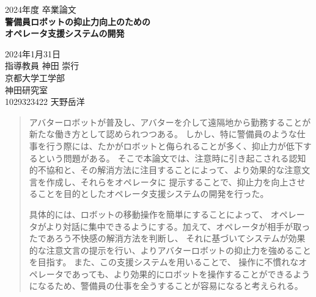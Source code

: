 \documentclass[11pt,a4j]{jreport}
\begin{document}
\thispagestyle{empty}
\begin{center}

\vspace{20mm}
{\Large\noindent 2024年度 卒業論文}\\
\vspace{40mm}
{\huge\noindent\textbf{警備員ロボットの抑止力向上のための}}\\
\medskip
{\huge\noindent\textbf{オペレータ支援システムの開発}}\\
\vspace{\baselineskip}
\vspace{40mm}

{\Large\noindent
2024年1月31日\\
\vspace{\baselineskip}
指導教員 神田  崇行\\
\vspace{\baselineskip}
京都大学工学部\\
神田研究室\\
\vspace{\baselineskip}
1029323422 天野岳洋\\
}
\vspace{40mm}

\end{center}

\thispagestyle{empty}
\clearpage

\renewcommand{\abstractname}{要旨}

\begin{abstract}
アバターロボットが普及し、アバターを介して遠隔地から勤務することが新たな働き方として認められつつある。
しかし、特に警備員のような仕事を行う際には、たかがロボットと侮られることが多く、抑止力が低下するという問題がある。
そこで本論文では、注意時に引き起こされる認知的不協和と、その解消方法に注目することによって、より効果的な注意文言を作成し、それらをオペレータに
提示することで、抑止力を向上させることを目的としたオペレータ支援システムの開発を行った。

具体的には、ロボットの移動操作を簡単にすることによって、
オペレータがより対話に集中できるようにする。加えて、オペレータが相手が取ったであろう不快感の解消方法を判断し、
それに基づいてシステムが効果的な注意文言の提示を行い、よりアバターロボットの抑止力を強めることを目指す。
また、この支援システムを用いることで、
操作に不慣れなオペレータであっても、より効果的にロボットを操作することができるようになるため、警備員の仕事を全うすることが容易になると考えられる。
\end{abstract}
\end{document}
